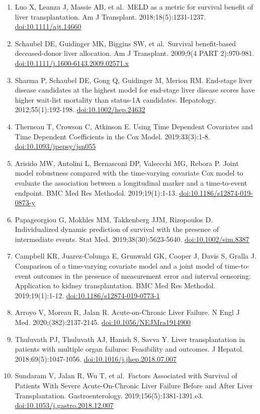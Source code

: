 \documentclass[11pt,english,]{book} %
\begin{document}
\begin{enumerate}
\item
  Luo X, Leanza J, Massie AB, et al.~MELD as a metric for survival benefit of liver transplantation. Am J Transplant. 2018;18(5):1231-1237. \url{doi:10.1111/ajt.14660}
\item
  Schaubel DE, Guidinger MK, Biggins SW, et al.~Survival benefit-based deceased-donor liver allocation. Am J Transplant. 2009;9(4 PART 2):970-981. \url{doi:10.1111/j.1600-6143.2009.02571.x}
\item
  Sharma P, Schaubel DE, Gong Q, Guidinger M, Merion RM. End-stage liver disease candidates at the highest model for end-stage liver disease scores have higher wait-list mortality than status-1A candidates. Hepatology. 2012;55(1):192-198. \url{doi:10.1002/hep.24632}
\item
  Therneau T, Crowson C, Atkinson E. Using Time Dependent Covariates and Time Dependent Coefficients in the Cox Model. 2019;33(3):1-8. \url{doi:10.1093/jpepsy/jsn055}
\item
  Arisido MW, Antolini L, Bernasconi DP, Valsecchi MG, Rebora P. Joint model robustness compared with the time-varying covariate Cox model to evaluate the association between a longitudinal marker and a time-to-event endpoint. BMC Med Res Methodol. 2019;19(1):1-13. \url{doi:10.1186/s12874-019-0873-y}
\item
  Papageorgiou G, Mokhles MM, Takkenberg JJM, Rizopoulos D. Individualized dynamic prediction of survival with the presence of intermediate events. Stat Med. 2019;38(30):5623-5640. \url{doi:10.1002/sim.8387}
\item
  Campbell KR, Juarez-Colunga E, Grunwald GK, Cooper J, Davis S, Gralla J. Comparison of a time-varying covariate model and a joint model of time-to-event outcomes in the presence of measurement error and interval censoring: Application to kidney transplantation. BMC Med Res Methodol. 2019;19(1):1-12. \url{doi:10.1186/s12874-019-0773-1}
\item
  Arroyo V, Moreau R, Jalan R. Acute-on-Chronic Liver Failure. N Engl J Med. 2020;(382):2137-2145. \url{doi:10.1056/NEJMra1914900}
\item
  Thuluvath PJ, Thuluvath AJ, Hanish S, Savva Y. Liver transplantation in patients with multiple organ failures: Feasibility and outcomes. J Hepatol. 2018;69(5):1047-1056. \url{doi:10.1016/j.jhep.2018.07.007}
\item
  Sundaram V, Jalan R, Wu T, et al.~Factors Associated with Survival of Patients With Severe Acute-On-Chronic Liver Failure Before and After Liver Transplantation. Gastroenterology. 2019;156(5):1381-1391.e3. \url{doi:10.1053/j.gastro.2018.12.007}

\end{enumerate}
\end{document}
